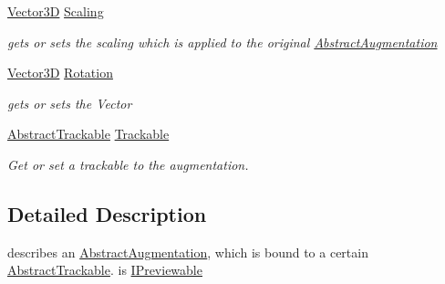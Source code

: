 \begin{DoxyCompactItemize}
\hyperlink{class_a_rdev_kit_1_1_model_1_1_project_1_1_vector3_d}{Vector3\-D} \hyperlink{class_a_rdev_kit_1_1_model_1_1_project_1_1_abstract_augmentation_adc3b84e8eb93f1ef50b3a689bd4c2a72}{Scaling}
\begin{DoxyCompactList}\small\item\em gets or sets the scaling which is applied to the original \hyperlink{class_a_rdev_kit_1_1_model_1_1_project_1_1_abstract_augmentation}{Abstract\-Augmentation} \end{DoxyCompactList}\item 
\hyperlink{class_a_rdev_kit_1_1_model_1_1_project_1_1_vector3_d}{Vector3\-D} \hyperlink{class_a_rdev_kit_1_1_model_1_1_project_1_1_abstract_augmentation_ac94095d5fa4f5d4339f66b259ff55e74}{Rotation}
\begin{DoxyCompactList}\small\item\em gets or sets the Vector \end{DoxyCompactList}\item 
\hyperlink{class_a_rdev_kit_1_1_model_1_1_project_1_1_abstract_trackable}{Abstract\-Trackable} \hyperlink{class_a_rdev_kit_1_1_model_1_1_project_1_1_abstract_augmentation_a5ef95a16a1d2b03cb6185b86e7120a9c}{Trackable}
\begin{DoxyCompactList}\small\item\em Get or set a trackable to the augmentation. \end{DoxyCompactList}\end{DoxyCompactItemize}


\subsection{Detailed Description}
describes an \hyperlink{class_a_rdev_kit_1_1_model_1_1_project_1_1_abstract_augmentation}{Abstract\-Augmentation}, which is bound to a certain \hyperlink{class_a_rdev_kit_1_1_model_1_1_project_1_1_abstract_trackable}{Abstract\-Trackable}. is \hyperlink{interface_a_rdev_kit_1_1_model_1_1_project_1_1_i_previewable}{I\-Previewable} 



